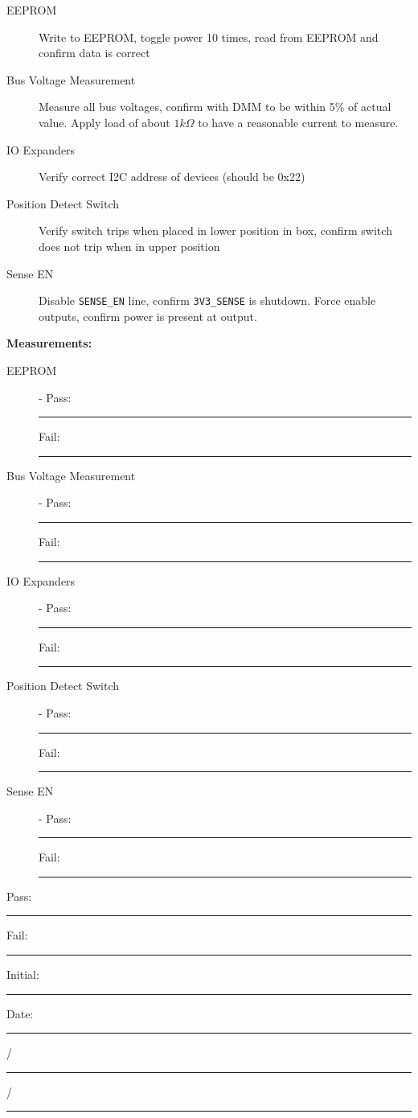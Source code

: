 \begin{description}
\item [EEPROM] Write to EEPROM, toggle power 10 times, read from EEPROM and confirm data is correct 
\item [Bus Voltage Measurement] Measure all bus voltages, confirm with DMM to be within 5\% of actual value. Apply load of about $1k\Omega$ to have a reasonable current to measure.
\item [IO Expanders] Verify correct I2C address of devices (should be 0x22)
\item [Position Detect Switch] Verify switch trips when placed in lower position in box, confirm switch does not trip when in upper position 
\item [Sense EN] Disable \texttt{SENSE\_EN} line, confirm \texttt{3V3\_SENSE} is shutdown. Force enable outputs, confirm power is present at output. 
\end{description}



{\Large \textbf{Measurements:}}\\[5pt]
\begin{description}
\item [EEPROM] -  \hfill Pass: \rule{1cm}{0.15mm} \hspace{0.5cm} Fail: \rule{1cm}{0.15mm}
\item [Bus Voltage Measurement] -  \hfill Pass: \rule{1cm}{0.15mm} \hspace{0.5cm} Fail: \rule{1cm}{0.15mm}
\item [IO Expanders] -  \hfill Pass: \rule{1cm}{0.15mm} \hspace{0.5cm} Fail: \rule{1cm}{0.15mm}
\item [Position Detect Switch] -  \hfill Pass: \rule{1cm}{0.15mm} \hspace{0.5cm} Fail: \rule{1cm}{0.15mm}
\item [Sense EN] -  \hfill Pass: \rule{1cm}{0.15mm} \hspace{0.5cm} Fail: \rule{1cm}{0.15mm}
\end{description}

\vfill

{\large Pass: \rule{1cm}{0.15mm} \hspace{1cm} Fail: \rule{1cm}{0.15mm}} \hfill Initial: \rule{2cm}{0.15mm} \hspace{1cm} Date: \rule{0.5cm}{0.15mm}/\rule{0.5cm}{0.15mm}/\rule{1cm}{0.15mm}\\[5pt]